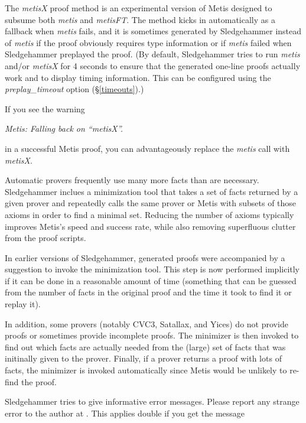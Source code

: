 \documentclass[a4paper,12pt]{article}
\begin{document}
The \textit{metisX} proof method is an experimental version of Metis designed to
subsume both \textit{metis} and \textit{metisFT}. The method kicks in
automatically as a fallback when \textit{metis} fails, and it is sometimes
generated by Sledgehammer instead of \textit{metis} if the proof obviously
requires type information or if \textit{metis} failed when Sledgehammer
preplayed the proof. (By default, Sledgehammer tries to run \textit{metis}
and/or \textit{metisX} for 4 seconds to ensure that the generated one-line
proofs actually work and to display timing information. This can be configured
using the \textit{preplay\_timeout} option (\S\ref{timeouts}).)

If you see the warning

\prew
\slshape
Metis: Falling back on ``\textit{metisX\/}''.
\postw

in a successful Metis proof, you can advantageously replace the \textit{metis}
call with \textit{metisX}.


Automatic provers frequently use many more facts than are necessary.
Sledgehammer inclues a minimization tool that takes a set of facts returned by a
given prover and repeatedly calls the same prover or Metis with subsets of those
axioms in order to find a minimal set. Reducing the number of axioms typically
improves Metis's speed and success rate, while also removing superfluous clutter
from the proof scripts.

In earlier versions of Sledgehammer, generated proofs were accompanied by a
suggestion to invoke the minimization tool. This step is now performed
implicitly if it can be done in a reasonable amount of time (something that can
be guessed from the number of facts in the original proof and the time it took
to find it or replay it).

In addition, some provers (notably CVC3, Satallax, and Yices) do not provide
proofs or sometimes provide incomplete proofs. The minimizer is then invoked to
find out which facts are actually needed from the (large) set of facts that was
initinally given to the prover. Finally, if a prover returns a proof with lots
of facts, the minimizer is invoked automatically since Metis would be unlikely
to re-find the proof.


Sledgehammer tries to give informative error messages. Please report any strange
error to the author at \authoremail. This applies double if you get the message
\end{document}
